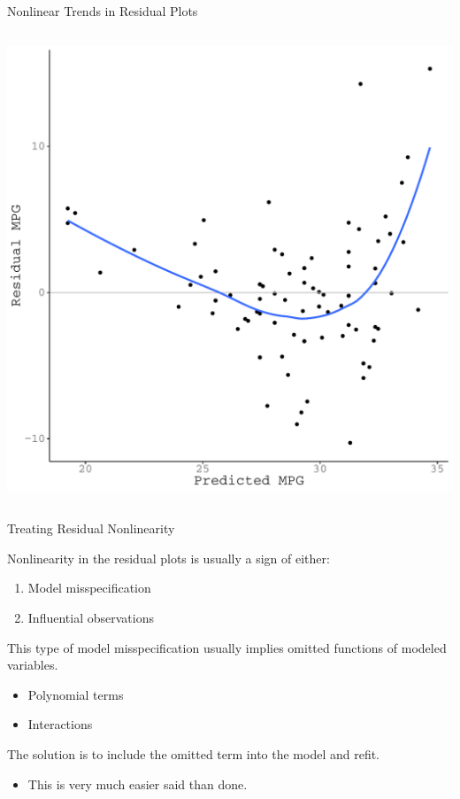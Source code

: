 \documentclass{beamer}\usepackage[]{graphicx}\usepackage[]{color}
\makeatletter
\def\maxwidth{ %
  \ifdim\Gin@nat@width>\linewidth
    \linewidth
  \else
    \Gin@nat@width
  \fi
}
\newenvironment{knitrout}{}{} %
\makeatother
\begin{document}
\begin{frame}{Nonlinear Trends in Residual Plots}
\begin{columns}
\begin{column}{0.5\textwidth}
\begin{knitrout}
{\centering \includegraphics[width=\maxwidth]{figure/unnamed-chunk-15-1} 

}



\end{knitrout}

\end{column}
\end{columns}
  
\end{frame}

\watermarkon %

\begin{frame}{Treating Residual Nonlinearity}
  
  Nonlinearity in the residual plots is usually a sign of either:
  \begin{enumerate}
  \item Model misspecification
  \item Influential observations
  \end{enumerate}
  \vb 
  This type of model misspecification usually implies omitted functions of 
  modeled variables.  
  \begin{itemize}
  \item Polynomial terms
  \item Interactions
  \end{itemize}
  \vb
  The solution is to include the omitted term into the model and refit.
  \begin{itemize}
  \item This is very much easier said than done.
  \end{itemize}
  
\end{frame}
\end{document}
